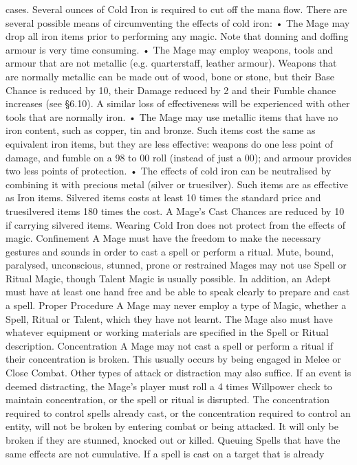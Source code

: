 \documentclass[a4paper]{article}
\begin{document}
\begin{multicols}{3}
cases. Several ounces of Cold Iron is required to
cut off the mana flow.
There are several possible means of circumventing
the effects of cold iron:
• The Mage may drop all iron items prior to performing any magic. Note that donning and doffing
armour is very time consuming.
• The Mage may employ weapons, tools and armour that are not metallic (e.g. quarterstaff, leather
armour). Weapons that are normally metallic can
be made out of wood, bone or stone, but their Base
Chance is reduced by 10, their Damage reduced by
2 and their Fumble chance increases (see §6.10). A
similar loss of effectiveness will be experienced
with other tools that are normally iron.
• The Mage may use metallic items that have no
iron content, such as copper, tin and bronze. Such
items cost the same as equivalent iron items, but
they are less effective: weapons do one less point
of damage, and fumble on a 98 to 00 roll (instead
of just a 00); and armour provides two less points
of protection.
• The effects of cold iron can be neutralised by
combining it with precious metal (silver or truesilver). Such items are as effective as Iron items.
Silvered items costs at least 10 times the standard
price and truesilvered items 180 times the cost. A
Mage’s Cast Chances are reduced by 10 if carrying
silvered items. Wearing Cold Iron does not protect
from the effects of magic.
Confinement
A Mage must have the freedom to make the necessary gestures and sounds in order to cast a spell or
perform a ritual. Mute, bound, paralysed, unconscious, stunned, prone or restrained Mages may not
use Spell or Ritual Magic, though Talent Magic is
usually possible. In addition, an Adept must have
at least one hand free and be able to speak clearly
to prepare and cast a spell.
Proper Procedure
A Mage may never employ a type of Magic,
whether a Spell, Ritual or Talent, which they have
not learnt. The Mage also must have whatever
equipment or working materials are specified in the
Spell or Ritual description.
Concentration
A Mage may not cast a spell or perform a ritual if
their concentration is broken. This usually occurs
by being engaged in Melee or Close Combat. Other
types of attack or distraction may also suffice. If an
event is deemed distracting, the Mage’s player
must roll a 4 times Willpower check to maintain
concentration, or the spell or ritual is disrupted.
The concentration required to control spells already
cast, or the concentration required to control an
entity, will not be broken by entering combat or
being attacked. It will only be broken if they are
stunned, knocked out or killed.
Queuing
Spells that have the same effects are not cumulative. If a spell is cast on a target that is already

\end{multicols}
\end{document}
